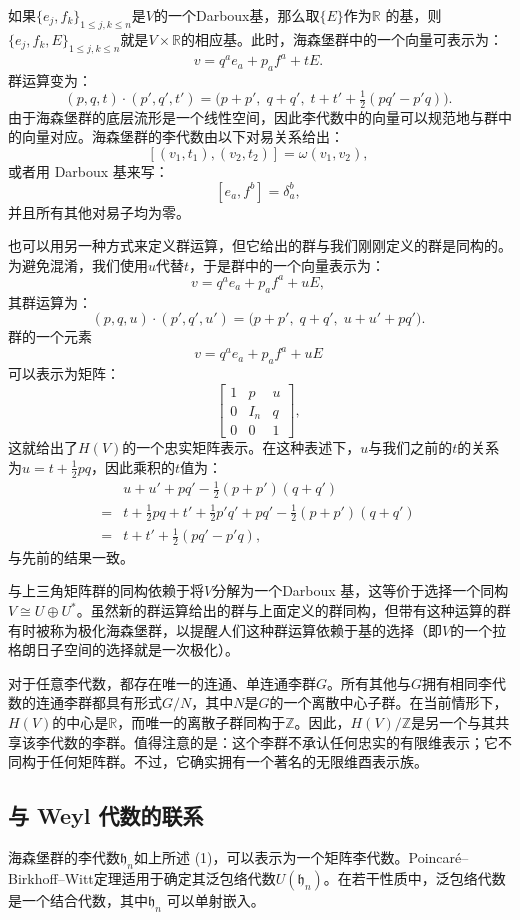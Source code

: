如果$\{e_{j}, f_{k}\}_{1 \leq j,k \leq n}$是$V$的一个Darboux基，那么取$\{E\}$作为$\mathbb{R}$ 的基，则$\{e_{j}, f_{k}, E\}_{1 \leq j,k \leq n}$就是$V \times \mathbb{R}$的相应基。此时，海森堡群中的一个向量可表示为：
$$
v = q^{a} e_{a} + p_{a} f^{a} + tE.~
$$
群运算变为：
$$
(p, q, t) \cdot (p', q', t') = \big(p + p',\; q + q',\; t + t' + \tfrac{1}{2}(pq' - p'q)\big).~
$$
由于海森堡群的底层流形是一个线性空间，因此李代数中的向量可以规范地与群中的向量对应。海森堡群的李代数由以下对易关系给出：
$$
[(v_{1}, t_{1}), (v_{2}, t_{2})] = \omega(v_{1}, v_{2}),~
$$
或者用 Darboux 基来写：
$$
[e_{a}, f^{b}] = \delta_{a}^{b},~
$$
并且所有其他对易子均为零。

也可以用另一种方式来定义群运算，但它给出的群与我们刚刚定义的群是同构的。为避免混淆，我们使用$u$代替$t$，于是群中的一个向量表示为：
$$
v = q^{a} e_{a} + p_{a} f^{a} + uE,~
$$
其群运算为：
$$
(p, q, u) \cdot (p', q', u') = \big(p + p',\; q + q',\; u + u' + pq'\big).~
$$
群的一个元素
$$
v = q^{a} e_{a} + p_{a} f^{a} + uE~
$$
可以表示为矩阵：
$$
\begin{bmatrix}
1 & p & u \\
0 & I_{n} & q \\
0 & 0 & 1
\end{bmatrix},~
$$
这就给出了$H(V)$的一个忠实矩阵表示。在这种表述下，$u$与我们之前的$t$的关系为$u = t + \tfrac{1}{2}pq$，因此乘积的$t$值为：
$$
\begin{aligned}
&u + u' + pq' - \tfrac{1}{2}(p+p')(q+q') \\
={}& t + \tfrac{1}{2}pq + t' + \tfrac{1}{2}p'q' + pq' - \tfrac{1}{2}(p+p')(q+q') \\
={}& t + t' + \tfrac{1}{2}(pq' - p'q),
\end{aligned}~
$$
与先前的结果一致。

与上三角矩阵群的同构依赖于将$V$分解为一个Darboux 基，这等价于选择一个同构$V \cong U \oplus U^{*}$。虽然新的群运算给出的群与上面定义的群同构，但带有这种运算的群有时被称为极化海森堡群，以提醒人们这种群运算依赖于基的选择（即$V$的一个拉格朗日子空间的选择就是一次极化）。

对于任意李代数，都存在唯一的连通、单连通李群$G$。所有其他与$G$拥有相同李代数的连通李群都具有形式$G/N$，其中$N$是$G$的一个离散中心子群。在当前情形下，$H(V)$的中心是$\mathbb{R}$，而唯一的离散子群同构于$\mathbb{Z}$。因此，$H(V)/\mathbb{Z}$是另一个与其共享该李代数的李群。值得注意的是：这个李群不承认任何忠实的有限维表示；它不同构于任何矩阵群。不过，它确实拥有一个著名的无限维酉表示族。
\subsection{与 Weyl 代数的联系}
海森堡群的李代数$\mathfrak{h}_{n}$如上所述 (1)，可以表示为一个矩阵李代数。Poincaré–Birkhoff–Witt定理适用于确定其泛包络代数$U(\mathfrak{h}_{n})$。在若干性质中，泛包络代数是一个结合代数，其中$\mathfrak{h}_{n}$ 可以单射嵌入。

